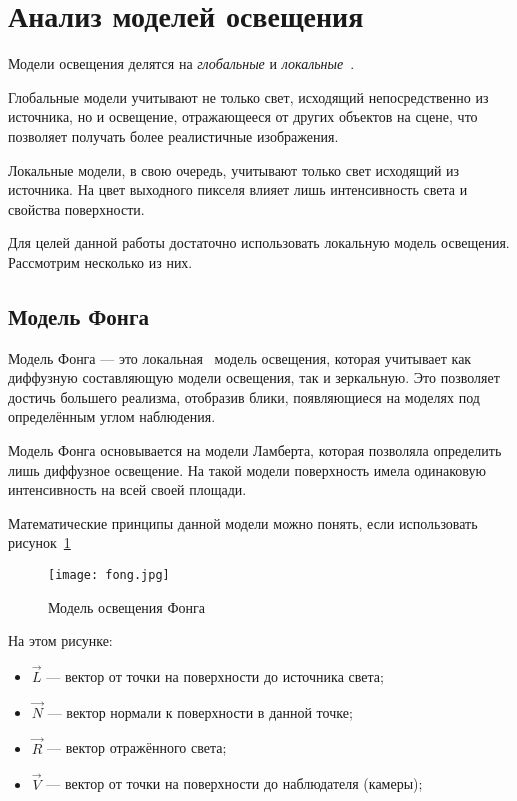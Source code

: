\section{Анализ моделей освещения}

Модели освещения делятся на \emph{глобальные} и \emph{локальные}~\cite{CGPaP}.

Глобальные модели учитывают не только свет, исходящий непосредственно из источника, но и освещение, отражающееся от других объектов на сцене, что позволяет получать более реалистичные изображения.

Локальные модели, в свою очередь, учитывают только свет исходящий из источника. На цвет выходного пикселя влияет лишь интенсивность света и свойства поверхности.

Для целей данной работы достаточно использовать локальную модель освещения. Рассмотрим несколько из них.

\subsection{Модель Фонга}

Модель Фонга --- это локальная~\cite{CGPaP} модель освещения, которая учитывает как диффузную составляющую модели освещения, так и зеркальную. Это позволяет достичь большего реализма, отобразив блики, появляющиеся на моделях под определённым углом наблюдения.

Модель Фонга основывается на модели Ламберта, которая позволяла определить лишь диффузное освещение. На такой модели поверхность имела одинаковую интенсивность на всей своей площади.

Математические принципы данной модели можно понять, если использовать рисунок~\ref{fig:fong}

\begin{figure}[h]
    \centering
    \texttt{[image: fong.jpg]}
    \caption{Модель освещения Фонга}
    \label{fig:fong}
\end{figure}

На этом рисунке:
\begin{itemize}
    \item $\vec{L}$ --- вектор от точки на поверхности до источника света;
    \item $\vec{N}$ --- вектор нормали к поверхности в данной точке; 
    \item $\vec{R}$ --- вектор отражённого света;
    \item $\vec{V}$ --- вектор от точки на поверхности до наблюдателя (камеры);
\end{itemize}

